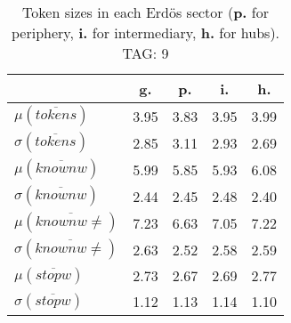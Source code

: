 \begin{table}[h!]
\begin{center}
\begin{tabular}{| l || c | c | c | c |}\hline
 & {\bf g.} & {\bf p.} & {\bf i.} & {\bf h.} \\\hline\hline
$\mu(\overline{tokens})$ & 3.95  & 3.83  & 3.95  & 3.99 \\
$\sigma(\overline{tokens})$ & 2.85  & 3.11  & 2.93  & 2.69 \\\hline
$\mu(\overline{knownw})$ & 5.99  & 5.85  & 5.93  & 6.08 \\
$\sigma(\overline{knownw})$ & 2.44  & 2.45  & 2.48  & 2.40 \\\hline
$\mu(\overline{knownw \neq})$ & 7.23  & 6.63  & 7.05  & 7.22 \\
$\sigma(\overline{knownw \neq})$ & 2.63  & 2.52  & 2.58  & 2.59 \\\hline
$\mu(\overline{stopw})$ & 2.73  & 2.67  & 2.69  & 2.77 \\
$\sigma(\overline{stopw})$ & 1.12  & 1.13  & 1.14  & 1.10 \\\hline
\end{tabular}
\caption{Token sizes in each Erd\"os sector ({{\bf p.}} for periphery, {{\bf i.}} for intermediary, {{\bf h.}} for hubs). TAG: 9}
\end{center}
\end{table}